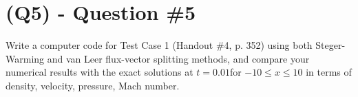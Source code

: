 \section{(Q5) - Question \#5}
\label{sec:Q5}

Write a computer code for Test Case 1 (Handout \#4, p. 352) using both Steger-Warming and van Leer flux-vector splitting methods, and compare your numerical results with the exact solutions at $t = 0.01 $for $-10 \le x \le 10$ in terms of density, velocity, pressure, Mach number.